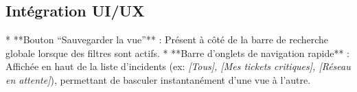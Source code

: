 \documentclass[12pt,a4paper]{article}
\begin{document}
\subsection{Intégration UI/UX}
* **Bouton ``Sauvegarder la vue''** : Présent à côté de la barre de recherche globale lorsque des filtres sont actifs.
* **Barre d'onglets de navigation rapide** : Affichée en haut de la liste d'incidents (ex: \textit{[Tous], [Mes tickets critiques], [Réseau en attente]}), permettant de basculer instantanément d'une vue à l'autre.
\end{document}
